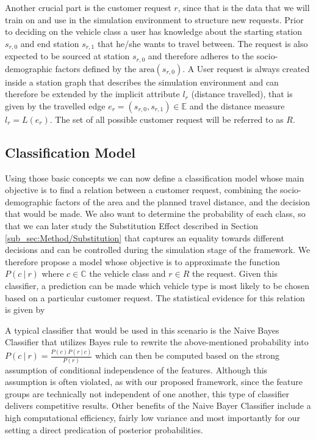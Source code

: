 Another crucial part is the customer request $r$, since that is the data that we will train on and use in the simulation
environment to structure new requests. Prior to deciding on the vehicle class a user has knowledge about
the starting station $s_{r, 0}$ and end station $s_{r, 1}$ that he/she wants to travel between. The request is also expected
to be sourced at station $s_{r, 0}$ and therefore adheres to the socio-demographic factors defined by the $\text{area}(s_{r, 0})$.
A User request is always created inside a station graph that describes the simulation environment and can therefore
be extended by the implicit attribute $l_r$ (distance travelled), that is given by the travelled edge $e_r = (s_{r, 0}, s_{r, 1}) \in \mathbb{E}$
and the distance measure $l_r = L(e_r)$. The set of all possible customer request will be referred to as $R$.

\subsection{Classification Model}
\label{sub_sec:Method/Class}

Using those basic concepts we can now define a classification model whose
main objective is to find a relation between a customer request, combining the socio-demographic factors of the area
and the planned travel distance, and the decision that would be made. We also want to determine the
probability of each class, so that we can later study the Substitution Effect described in Section \ref{sub_sec:Method/Substitution}
that captures an equality towards different decisions and can be controlled during the
simulation stage of the framework. We therefore propose a model whose objective is to
approximate the function $P(c \ | \ r)$ where $c \in \mathbb{C}$ the vehicle class and  $r \in R$ the request.
Given this classifier, a prediction can be made which vehicle type is most likely to be chosen based
on a particular customer request. The statistical evidence for this relation is given by  

A typical classifier that would be used in this scenario is the Naive Bayes Classifier that utilizes
Bayes rule to rewrite the above-mentioned probability into $P(c \ | \ r) = \frac{P(c)P(r \ | \ c)}{P(r)}$
which can then be computed based on the strong assumption of conditional independence of the features.
Although this assumption is often violated, as with our proposed framework, since the feature groups
are technically not independent of one another, this type of classifier delivers competitive results.
Other benefits of the Naive Bayer Classifier include a high computational efficiency, fairly low variance
and most importantly for our setting a direct predication of posterior probabilities. \cite{Webb2010}

